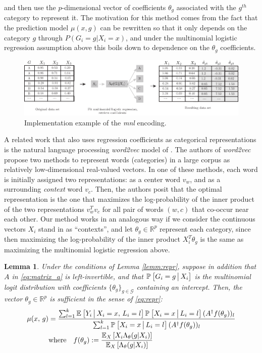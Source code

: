 \documentclass{article}
\theoremstyle{plain}
\newtheorem{lemm}[prop]{Lemma}
\theoremstyle{definition}
\theoremstyle{remark}
\begin{document}
\noindent and then use the $p$-dimensional vector of coefficients $\theta_{g}$ associated with the $g^{th}$ category to represent it. The motivation for this method comes from the fact that the prediction model $\mu(x, g)$ can be rewritten so that it only depends on the category $g$ through $P(G_{i}=g|X_{i}=x)$, and under the  multinomial logistic regression assumption above this boils down to dependence on the $\theta_{g}$ coefficients.

\begin{figure}[H]
  \centering
  \includegraphics[width=\textwidth]{figures/mnl.pdf}
  \caption{Implementation example of the \emph{mnl} encoding.}
  \label{fig:mnl_encoding}
\end{figure}


A related work that also uses regression coefficients as categorical representations is the natural language processing \emph{word2vec} model of \cite{mikolov2013efficient}. The authors of \emph{word2vec} propose two methods to represent words (categories) in a large corpus as relatively low-dimensional real-valued vectors. In one of these methods, each word is initially assigned two representations: as a center word $v_{w}$, and as a surrounding \emph{context} word $v_{c}$. Then, the authors posit that the optimal representation is the one that maximizes the log-probability of the inner product of the two representations $v_{w}^{T}v_{c}$ for all pair of words $(w, c)$ that co-occur near each other. Our method works in an analogous way if we consider the continuous vectors $X_{i}$ stand in as ``contexts'', and let $\theta_{g} \in \mathbb{R}^{p}$ represent each category, since then maximizing the log-probability of the inner product $X_{i}^{T}\theta_{g}$ is the same as maximizing the multinomial logistic regression above.


\begin{lemm}
\label{lemm:mnl}
Under the conditions of Lemma \ref{lemm:repr}, suppose in addition that $A$ in \eqref{eq:matrix_a} is left-invertible, and that $\PP{ G_{i}=g \cond X_{i}}$ is the multinomial logit distribution with coefficients $\{\theta_{g} \}_{g \in \mathcal{G}}$ containing an intercept. Then, the vector $\theta_{g} \in \mathbb{R}^{p}$ is sufficient in the sense of \eqref{eq:repr}:
\begin{align}
\mu(x, \, g) &= \frac{\sum_{l = 1}^k  \EE{Y_i \cond X_i = x, \, L_i = l} \PP{X_i = x \cond L_i = l} (A^\dagger f(\theta_g))_l}
                     {\sum_{l = 1}^k \PP{X_i = x \cond L_i = l} (A^\dagger f(\theta_{g}))_{l} } \\
&\text{where} \quad f(\theta_{g}) := \frac{\EE[X]{ X_{i}\Lambda_{\theta}(g|X_{i})}}{\EE[X]{\Lambda_{\theta}(g|X_{i})}}
\end{align}
\end{lemm}
\end{document}
